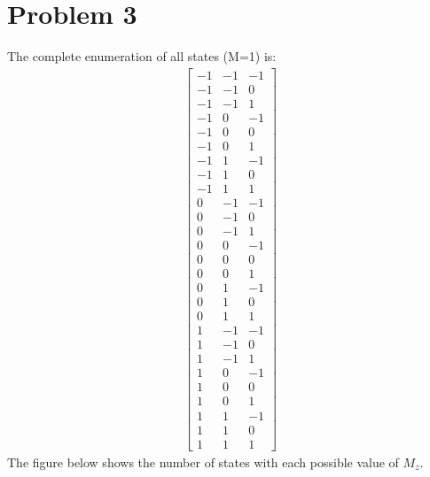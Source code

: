 \documentclass[a4paper,11pt]{article}
\numberwithin{equation}{section}
\begin{document}
\section{Problem 3}
The complete enumeration of all states (M=1) is:
\begin{gather}
 \begin{bmatrix}
    -1 &   -1 &   -1\\
    -1 &   -1 &    0\\
    -1 &   -1 &    1\\
    -1 &    0 &   -1\\
    -1 &    0 &    0\\
    -1 &    0 &    1\\
    -1 &    1 &   -1\\
    -1 &    1 &    0\\
    -1 &    1 &    1\\
     0 &   -1 &   -1\\
     0 &   -1 &    0\\
     0 &   -1 &    1\\
     0 &    0 &   -1\\
     0 &    0 &    0\\
     0 &    0 &    1\\
     0 &    1 &   -1\\
     0 &    1 &    0\\
     0 &    1 &    1\\
     1 &   -1 &   -1\\
     1 &   -1 &    0\\
     1 &   -1 &    1\\
     1 &    0 &   -1\\
     1 &    0 &    0\\
     1 &    0 &    1\\
     1 &    1 &   -1\\
     1 &    1 &    0\\
     1 &    1 &    1
 \end{bmatrix}
\end{gather}
The figure below shows the number of states with each possible value of $M_z$.
\end{document}
